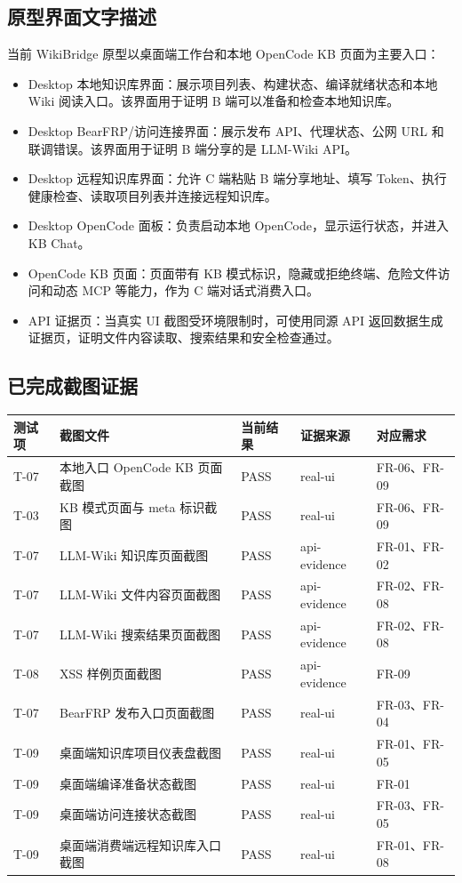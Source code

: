 \documentclass[UTF8,a4paper,12pt,fontset=fandol]{ctexart}
\begin{document}
\subsection{原型界面文字描述}
当前 WikiBridge 原型以桌面端工作台和本地 OpenCode KB 页面为主要入口：
\begin{itemize}
  \item Desktop 本地知识库界面：展示项目列表、构建状态、编译就绪状态和本地 Wiki 阅读入口。该界面用于证明 B 端可以准备和检查本地知识库。
  \item Desktop BearFRP/访问连接界面：展示发布 API、代理状态、公网 URL 和联调错误。该界面用于证明 B 端分享的是 LLM-Wiki API。
  \item Desktop 远程知识库界面：允许 C 端粘贴 B 端分享地址、填写 Token、执行健康检查、读取项目列表并连接远程知识库。
  \item Desktop OpenCode 面板：负责启动本地 OpenCode，显示运行状态，并进入 KB Chat。
  \item OpenCode KB 页面：页面带有 KB 模式标识，隐藏或拒绝终端、危险文件访问和动态 MCP 等能力，作为 C 端对话式消费入口。
  \item API 证据页：当真实 UI 截图受环境限制时，可使用同源 API 返回数据生成证据页，证明文件内容读取、搜索结果和安全检查通过。
\end{itemize}

\subsection{已完成截图证据}
\begin{longtable}{>{\centering\arraybackslash}p{1.3cm}p{6.2cm}>{\centering\arraybackslash}p{1.6cm}>{\centering\arraybackslash}p{2.0cm}p{2.7cm}}
\toprule
测试项 & 截图文件 & 当前结果 & 证据来源 & 对应需求 \\
\midrule
T-07 & 本地入口 OpenCode KB 页面截图 & PASS & real-ui & FR-06、FR-09 \\
T-03 & KB 模式页面与 meta 标识截图 & PASS & real-ui & FR-06、FR-09 \\
T-07 & LLM-Wiki 知识库页面截图 & PASS & api-evidence & FR-01、FR-02 \\
T-07 & LLM-Wiki 文件内容页面截图 & PASS & api-evidence & FR-02、FR-08 \\
T-07 & LLM-Wiki 搜索结果页面截图 & PASS & api-evidence & FR-02、FR-08 \\
T-08 & XSS 样例页面截图 & PASS & api-evidence & FR-09 \\
T-07 & BearFRP 发布入口页面截图 & PASS & real-ui & FR-03、FR-04 \\
T-09 & 桌面端知识库项目仪表盘截图 & PASS & real-ui & FR-01、FR-05 \\
T-09 & 桌面端编译准备状态截图 & PASS & real-ui & FR-01 \\
T-09 & 桌面端访问连接状态截图 & PASS & real-ui & FR-03、FR-05 \\
T-09 & 桌面端消费端远程知识库入口截图 & PASS & real-ui & FR-01、FR-08 \\
\bottomrule
\end{longtable}
\end{document}
